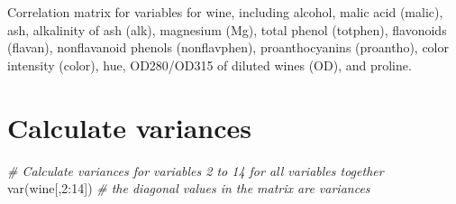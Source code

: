 \documentclass[
]{book}
\newenvironment{Shaded}{\begin{snugshade}}{\end{snugshade}}
\newcommand{\CommentTok}[1]{\textcolor[rgb]{0.56,0.35,0.01}{\textit{#1}}}
\newcommand{\DecValTok}[1]{\textcolor[rgb]{0.00,0.00,0.81}{#1}}
\newcommand{\FunctionTok}[1]{\textcolor[rgb]{0.00,0.00,0.00}{#1}}
\newcommand{\NormalTok}[1]{#1}
\newcommand{\SpecialCharTok}[1]{\textcolor[rgb]{0.00,0.00,0.00}{#1}}
\begin{document}
Correlation matrix for variables for wine, including alcohol, malic acid (malic), ash, alkalinity of ash (alk), magnesium (Mg), total phenol (totphen), flavonoids (flavan), nonflavanoid phenols (nonflavphen), proanthocyanins (proantho), color intensity (color), hue, OD280/OD315 of diluted wines (OD), and proline.

\hypertarget{calculate-variances}{%
\section{Calculate variances}\label{calculate-variances}}

\begin{Shaded}
\begin{Highlighting}[]
\CommentTok{\# Calculate variances for variables 2 to 14 for all variables together}
\FunctionTok{var}\NormalTok{(wine[,}\DecValTok{2}\SpecialCharTok{:}\DecValTok{14}\NormalTok{]) }\CommentTok{\# the diagonal values in the matrix are variances}
\end{Highlighting}
\end{Shaded}
\end{document}
